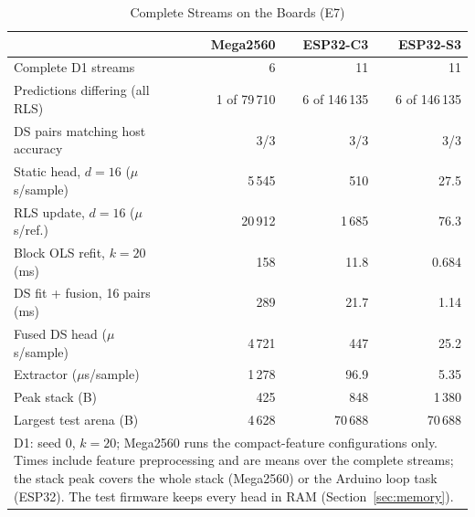 \begin{table}[t]
\caption{Complete Streams on the Boards (E7)}
\label{tab:e7}\centering\scriptsize\setlength{\tabcolsep}{3pt}
\begin{tabular}{l r r r}\toprule
 & Mega2560 & ESP32-C3 & ESP32-S3\\\midrule
Complete D1 streams & 6 & 11 & 11\\
Predictions differing (all RLS) & 1 of 79\,710 & 6 of 146\,135 & 6 of 146\,135\\
DS pairs matching host accuracy & 3/3 & 3/3 & 3/3\\
Static head, $d=16$ ($\mu$s/sample) & 5\,545 & 510 & 27.5\\
RLS update, $d=16$ ($\mu$s/ref.) & 20\,912 & 1\,685 & 76.3\\
Block OLS refit, $k=20$ (ms) & 158 & 11.8 & 0.684\\
DS fit + fusion, 16 pairs (ms) & 289 & 21.7 & 1.14\\
Fused DS head ($\mu$s/sample) & 4\,721 & 447 & 25.2\\
Extractor ($\mu$s/sample) & 1\,278 & 96.9 & 5.35\\
Peak stack (B) & 425 & 848 & 1\,380\\
Largest test arena (B) & 4\,628 & 70\,688 & 70\,688\\
\bottomrule
\multicolumn{4}{p{0.95\columnwidth}}{\scriptsize D1: seed 0, $k=20$; Mega2560 runs the compact-feature configurations only. Times include feature preprocessing and are means over the complete streams; the stack peak covers the whole stack (Mega2560) or the Arduino loop task (ESP32). The test firmware keeps every head in RAM (Section~\ref{sec:memory}).}
\end{tabular}
\end{table}
